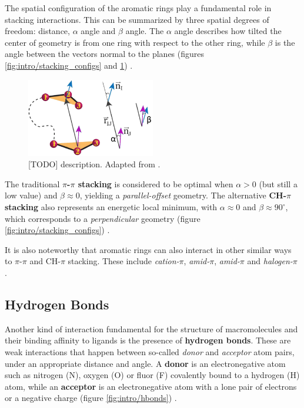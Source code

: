     The spatial configuration of the aromatic rings play a fundamental role in stacking interactions. This can be summarized by three spatial degrees of freedom: distance, $\alpha$ angle and $\beta$ angle. The $\alpha$ angle describes how tilted the center of geometry is from one ring with respect to the other ring, while $\beta$ is the angle between the vectors normal to the planes (figures \ref{fig:intro/stacking_configs} and \ref{fig:intro/stacking_angles}) \cite{stacking_general_2020, rna_2015, aromatic_2018}.

    \begin{figure}[H]
      \centering
      \includegraphics[width=0.5\textwidth]{figures/intro/stacking_angles.png}
      \caption{\label{fig:intro/stacking_angles} [TODO] description. Adapted from \cite{rna_2015}.}
    \end{figure}

    The traditional \textbf{$\pi$-$\pi$ stacking} is considered to be optimal when $\alpha>0$ (but still a low value) and $\beta \approx 0$, yielding a \textit{parallel-offset} geometry. The alternative \textbf{CH-$\pi$ stacking} also represents an energetic local minimum, with $\alpha \approx 0$ and $\beta \approx 90^{\circ}$, which corresponds to a \textit{perpendicular} geometry (figure \ref{fig:intro/stacking_configs}) \cite{stacking_general_2020}.

    It is also noteworthy that aromatic rings can also interact in other similar ways to $\pi$-$\pi$ and CH-$\pi$ stacking. These include \textit{cation-$\pi$}, \textit{amid-$\pi$}, \textit{amid-$\pi$} and \textit{halogen-$\pi$} \cite{stacking_binding_2020, electrostatics_2020}.

  \subsection{Hydrogen Bonds}
    Another kind of interaction fundamental for the structure of macromolecules and their binding affinity to ligands is the presence of \textbf{hydrogen bonds}. These are weak interactions that happen between so-called \textit{donor} and \textit{acceptor} atom pairs, under an appropriate distance and angle. A \textbf{donor} is an electronegative atom such as nitrogen (N), oxygen (O) or fluor (F) covalently bound to a hydrogen (H) atom, while an \textbf{acceptor} is an electronegative atom with a lone pair of electrons or a negative charge (figure \ref{fig:intro/hbonds}) \cite{hbonds_2023}.

